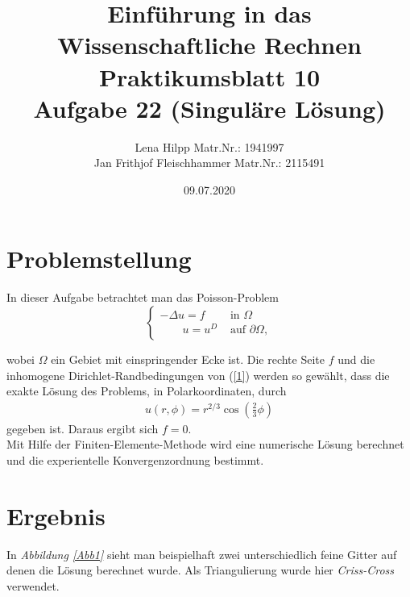 \documentclass[11pt,a4paper]{article}
\title{Einf\"uhrung in das Wissenschaftliche Rechnen\\
  Praktikumsblatt 10\\
  Aufgabe 22 (Singuläre Lösung)}
\author{Lena Hilpp Matr.Nr.: 1941997 \\ Jan Frithjof Fleischhammer Matr.Nr.: 2115491}
\date{09.07.2020}
\begin{document}
  
  \maketitle
  
  \section*{Problemstellung}
 
 
 In dieser Aufgabe betrachtet man das Poisson-Problem
 \begin{equation}
\begin{cases}
 -\Delta u = f  & \text{ in } \Omega \\
\qquad u = u^D  & \text{ auf } \partial\Omega, 
 \end{cases}
 \label{1}
 \end{equation}
 
wobei $\Omega$ ein Gebiet mit einspringender Ecke ist. Die rechte Seite $f$ und die inhomogene Dirichlet-Randbedingungen von (\ref{1}) werden so gewählt, dass die exakte Lösung des Problems, in Polarkoordinaten, durch 
\begin{align*}
u(r,\phi)=r^{2/3}\cos \left(\frac{2}{3} \phi\right)
\end{align*}
gegeben ist. Daraus ergibt sich $f=0$.\\
Mit Hilfe der Finiten-Elemente-Methode wird eine numerische Lösung berechnet und die experientelle Konvergenzordnung bestimmt.
  
  \section*{Ergebnis}
   In \textit{Abbildung \ref{Abb1}} sieht man beispielhaft zwei unterschiedlich feine Gitter auf denen die Lösung berechnet wurde. Als Triangulierung wurde hier \textit{Criss-Cross} verwendet.  
  
\end{document}
